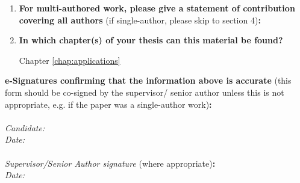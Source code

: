 {\begin{enumerate}[leftmargin=*,label={\bfseries\arabic*.}]
\begin{enumerate}[label={\alph*)}]
	\item \textbf{Has the manuscript been uploaded to a preprint server `e.g. medRxiv'?
	\\
	If `Yes', please please give a link or doi:}

	Yes, \url{https://www.researchgate.net/publication/367116849_Stability_of_white_matter_tract_segmentation_methods_with_decreasing_data_quality}
	\item \textbf{Where is the work intended to be published?}

	N/A
	\item \textbf{List the manuscript's authors in the intended authorship order:}

	\citeauthor*{Young2022a}
	\item \textbf{Stage of publication:}

	Work presented at conference, no proceedings published.
\end{enumerate}

\item \textbf{For multi-authored work, please give a statement of contribution covering all authors} (if single-author, please skip to section 4)\textbf{:}
\item \textbf{In which chapter(s) of your thesis can this material be found?}

Chapter \ref{chap:applications}
\end{enumerate}

\textbf{e-Signatures confirming that the information above is accurate}
(this form should be co-signed by the supervisor/ senior author unless this is not appropriate, e.g. if the paper was a single-author work)\textbf{:}\\
\\[\baselineskip]
\textit{Candidate:}
\\[\baselineskip]
\textit{Date:}\\\signdate
\\[\baselineskip]
\textit{Supervisor/Senior Author signature} (where appropriate)\textbf{:}
\\[\baselineskip]
\textit{Date:}\\\signdate
%
}%
